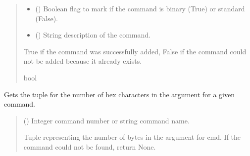 \documentclass[letterpaper,10pt,english]{sphinxmanual}
\begin{document}
\begin{fulllineitems}
\begin{fulllineitems}
\begin{quote}
\begin{description}
\begin{itemize}
\item {} 
\sphinxAtStartPar
{} () \textendash{} Boolean flag to mark if the command is binary (True) or standard (False).

\item {} 
\sphinxAtStartPar
{} () \textendash{} String description of the command.

\end{itemize}

\sphinxAtStartPar
True if the command was successfully added, False if the command could not be added                 because it already exists.

\sphinxAtStartPar
bool

\end{description}\end{quote}

\end{fulllineitems}


\begin{fulllineitems}
\label{\detokenize{PodApi.Commands:PodApi.Commands.PodCommands.CommandSet.ArgumentHexChar}}
\pysigstartsignatures
{}
\pysigstopsignatures
\sphinxAtStartPar
Gets the tuple for the number of hex characters in the argument for a given command.
\begin{quote}\begin{description}
\sphinxAtStartPar
{} (\sphinxstyleliteralemphasis{\sphinxupquote{ | }}) \textendash{} Integer command number or string command name.

\sphinxAtStartPar
Tuple representing the number of bytes in the argument for cmd. If the                 command could not be found, return None.


\end{description}
\end{quote}
\end{fulllineitems}
\end{fulllineitems}
\end{document}

